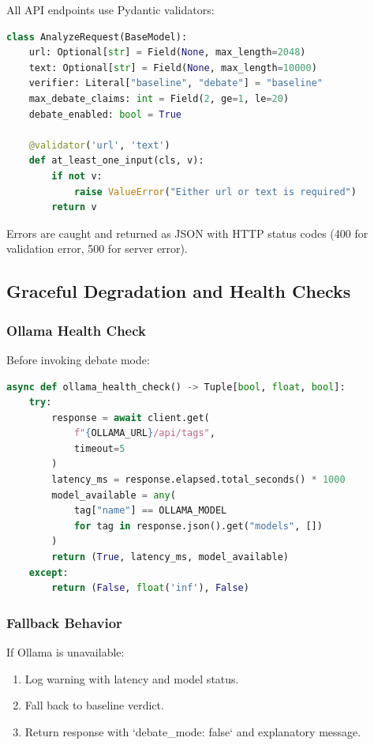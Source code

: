 \documentclass[12pt,a4paper,twoside]{article}
\begin{document}
All API endpoints use Pydantic validators:

\begin{lstlisting}[language=python]
class AnalyzeRequest(BaseModel):
    url: Optional[str] = Field(None, max_length=2048)
    text: Optional[str] = Field(None, max_length=10000)
    verifier: Literal["baseline", "debate"] = "baseline"
    max_debate_claims: int = Field(2, ge=1, le=20)
    debate_enabled: bool = True
    
    @validator('url', 'text')
    def at_least_one_input(cls, v):
        if not v:
            raise ValueError("Either url or text is required")
        return v
\end{lstlisting}

Errors are caught and returned as JSON with HTTP status codes (400 for validation error, 500 for server error).

\subsection{Graceful Degradation and Health Checks}

\subsubsection{Ollama Health Check}

Before invoking debate mode:

\begin{lstlisting}[language=python]
async def ollama_health_check() -> Tuple[bool, float, bool]:
    try:
        response = await client.get(
            f"{OLLAMA_URL}/api/tags", 
            timeout=5
        )
        latency_ms = response.elapsed.total_seconds() * 1000
        model_available = any(
            tag["name"] == OLLAMA_MODEL 
            for tag in response.json().get("models", [])
        )
        return (True, latency_ms, model_available)
    except:
        return (False, float('inf'), False)
\end{lstlisting}

\subsubsection{Fallback Behavior}

If Ollama is unavailable:
\begin{enumerate}
    \item Log warning with latency and model status.
    \item Fall back to baseline verdict.
    \item Return response with `debate_mode: false` and explanatory message.
\end{enumerate}
\end{document}
